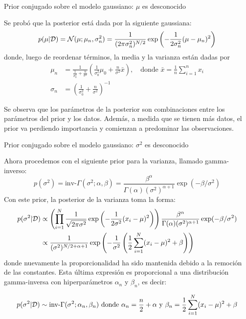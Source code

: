 \documentclass[9pt, handout]{beamer}
\begin{document}
\begin{frame}{Prior conjugado sobre el modelo gaussiano: $\mu$ es desconocido}

Se probó que la posterior está dada por la siguiente gaussiana:
  \begin{equation*}
 	p(\mu|{\mathcal D}) = {\mathcal N}(\mu;\mu_n,\sigma_n^2) = \frac{1}{(2\pi\sigma_n^2)^{N/2}}\exp\left(-\frac{1}{2\sigma_n^2}(\mu - \mu_n)^2\right)
 \end{equation*} 
 donde, luego de reordenar términos, la media y la varianza están dadas por 
 \begin{align*}
 	\mu_n &= \frac{1}{\tfrac{1}{\sigma_0^2} + \tfrac{n}{\sigma^2}} \left(\frac{1}{\sigma_0^2}\mu_0 + \frac{n}{\sigma^2}\bar{x} \right), \quad \text{donde } \bar{x} = \frac{1}{n}\sum_{i=1}^n x_i\label{eq:post_Gm}\\
 	\sigma_n &= \left(\frac{1}{\sigma_0^2} + \frac{n}{\sigma^2}\right)^{-1}
 \end{align*}\pause

Se observa que los parámetros de la posterior son combinaciones entre los parámetros del prior y los datos. Además, a medida que se tienen más datos, el prior va perdiendo importancia y comienzan a predominar las observaciones.
	
\end{frame}

\begin{frame}{Prior conjugado sobre el modelo gaussiano: $\sigma^2$ es desconocido}

Ahora procedemos con el siguiente prior para la varianza, llamado gamma-inverso:
 \begin{equation*}
 	p(\sigma^2)= \text{inv-}\Gamma(\sigma^2;\alpha,\beta) = \frac{\beta^\alpha}{\Gamma(\alpha) (\sigma^2)^{\alpha+1}}\exp(-\beta/\sigma^2)
 \end{equation*}\pause
Con este prior, la posterior de la varianza toma la forma:
 \begin{align*}
 	p(\sigma^2|{\mathcal D}) &\propto \left(\prod_{i=1}^N \frac{1}{\sqrt{2\pi\sigma^2}}\exp\left(-\frac{1}{2\sigma^2}(x_i-\mu)^2\right)\right) \frac{\beta^\alpha}{\Gamma(\alpha) (\sigma^2)^{\alpha+1}}\exp(-\beta/\sigma^2)\\
 	&\propto  \frac{1}{(\sigma^2)^{N/2+\alpha+1}}\exp\left(-\frac{1}{\sigma^2}\left(\frac{1}{2}\sum_{i=1}^N(x_i-\mu)^2 +\beta\right) \right)\nonumber
 \end{align*} 
 donde nuevamente la proporcionalidad ha sido mantenida debido a la remoción de las constantes. \pause Esta última expresión es proporcional a una distribución gamma-inversa con hiperparámetros $\alpha_n$ y $\beta_n$, es decir:
 
 \begin{equation*}
 	p(\sigma^2|{\mathcal D}) \sim \text{inv-}\Gamma(\sigma^2;\alpha_n,\beta_n) \text{ donde } \alpha_n = \frac{n}{2}+\alpha \text{ y } \beta_n = \frac{1}{2}\sum_{i=1}^N(x_i-\mu)^2 +\beta
 \end{equation*}
	
\end{frame}
\end{document}
